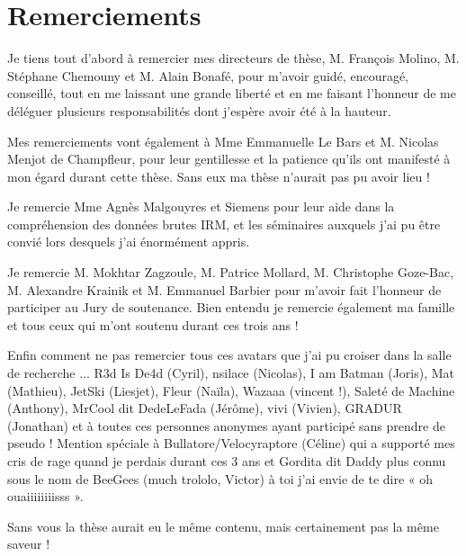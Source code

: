 \chapter*{Remerciements}

Je tiens tout d'abord à remercier mes directeurs de thèse, M. François Molino, M. Stéphane
Chemouny et M. Alain Bonafé, pour m'avoir guidé, encouragé, conseillé, tout en me laissant une
grande liberté et en me faisant l'honneur de me déléguer plusieurs responsabilités dont j'espère avoir
été à la hauteur.

Mes remerciements vont également à Mme Emmanuelle Le Bars et M. Nicolas Menjot de
Champfleur, pour leur gentillesse et la patience qu'ils ont manifesté à mon égard durant cette thèse.
Sans eux ma thèse n’aurait pas pu avoir lieu !

Je remercie Mme Agnès Malgouyres et Siemens pour leur aide dans la compréhension des
données brutes IRM, et les séminaires auxquels j’ai pu être convié lors desquels j’ai énormément
appris.

Je remercie M. Mokhtar Zagzoule, M. Patrice Mollard, M. Christophe Goze-Bac, M. Alexandre
Krainik et M. Emmanuel Barbier pour m'avoir fait l'honneur de participer au Jury de soutenance.
Bien entendu je remercie également ma famille et tous ceux qui m’ont soutenu durant ces
trois ans !

Enfin comment ne pas remercier tous ces avatars que j’ai pu croiser dans la salle de recherche
... R3d Is De4d (Cyril), nsilace (Nicolas), I am Batman (Joris), Mat (Mathieu), JetSki (Liesjet), Fleur (Naïla),
Wazaaa (vincent !), Saleté de Machine (Anthony), MrCool dit DedeLeFada (Jérôme), vivi (Vivien),
GRADUR (Jonathan) et à toutes ces personnes anonymes ayant participé sans prendre de pseudo !
Mention spéciale à Bullatore/Velocyraptore (Céline) qui a supporté mes cris de rage quand je perdais
durant ces 3 ans et Gordita dit Daddy plus connu sous le nom de BeeGees (much trololo, Victor) à toi
j’ai envie de te dire « oh ouaiiiiiiiisss ».

Sans vous la thèse aurait eu le même contenu, mais certainement pas la même saveur !
